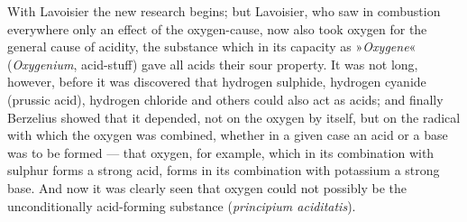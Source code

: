 \documentclass[12pt,a4paper]{book}
\begin{document}
With Lavoisier the new research begins; but Lavoisier, who saw in combustion
everywhere only an effect of the oxygen-cause, now also took oxygen for the
general cause of acidity, the substance which in its capacity as
»\textit{Oxygene}« (\textit{Oxygenium}, acid-stuff) gave all acids their sour
property. It was not long, however, before it was discovered that hydrogen
sulphide, hydrogen cyanide (prussic acid), hydrogen chloride and others could
also act as acids; and finally Berzelius showed that it depended, not on the
oxygen by itself, but on the radical with which the oxygen was combined,
whether in a given case an acid or a base was to be formed --- that oxygen, for
example, which in its combination with sulphur forms a strong acid, forms in
its combination with potassium a strong base. And now it was clearly seen that
oxygen could not possibly be the unconditionally acid-forming substance
(\textit{principium aciditatis}).
\end{document}
